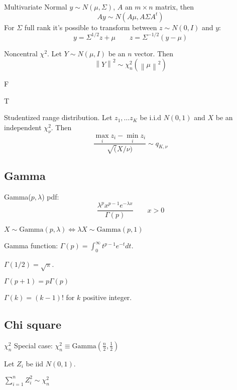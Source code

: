 \documentclass[12pt]{article}
\newcommand{\norm}[1]{\left\lVert#1\right\rVert}
\begin{document}
Multivariate Normal $y \sim N(\mu, \Sigma)$, $A$ an $m \times n$ matrix,
then 
\[
    Ay \sim N(A \mu, A \Sigma A^t)
\]
For $\Sigma$ full rank it's possible to transform between $z \sim
N(0, I)$ and $y$:
\[
    y = \Sigma^{1/2} z + \mu \qquad z = \Sigma^{-1/2} (y - \mu)
\]

Noncentral $\chi^2$. Let $Y \sim N(\mu, I)$ be an $n$ vector. Then 
\[
    \norm{Y}^2 \sim \chi^2_n(\norm{\mu}^2)
\]

F

T

Studentized range distribution. Let $z_1, \dots z_K$ be i.i.d $N(0, 1)$ and
$X$ be an independent $\chi^2_\nu$. Then
\[
    \frac{\max_i z_i - \min_i z_i}{\sqrt(X / \nu)} \sim q_{K, \nu}
\]

\subsection{Gamma}

Gamma($p, \lambda$)
pdf: 
\[
    \frac{\lambda^p x^{p-1} e^{-\lambda x}}{\Gamma(p)}
    \qquad x > 0
\]

$X \sim \text{Gamma}(p, \lambda) \iff \lambda X \sim \text{Gamma}(p, 1)$

Gamma function: $\Gamma(p) = \int_0^\infty t^{p-1} e^{-t} dt$.

$\Gamma(1/2) = \sqrt{\pi}$.

$\Gamma(p + 1) = p \Gamma(p)$

$\Gamma(k) = (k-1)!$ for $k$ positive integer.

\subsection{Chi square}

$\chi^2_n$
Special case: $\chi^2_n \equiv \text{Gamma}(\frac{n}{2}, \frac{1}{2})$

Let $Z_i$ be iid $N(0, 1)$.

$\sum_{i=1}^n Z_i^2 \sim \chi^2_n$
\end{document}
